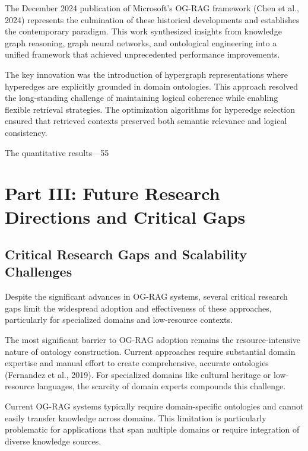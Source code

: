 \documentclass[12pt]{report}
\begin{document}
The December 2024 publication of Microsoft's OG-RAG framework (Chen et al., 2024) represents the culmination of these historical developments and establishes the contemporary paradigm. This work synthesized insights from knowledge graph reasoning, graph neural networks, and ontological engineering into a unified framework that achieved unprecedented performance improvements.

The key innovation was the introduction of hypergraph representations where hyperedges are explicitly grounded in domain ontologies. This approach resolved the long-standing challenge of maintaining logical coherence while enabling flexible retrieval strategies. The optimization algorithms for hyperedge selection ensured that retrieved contexts preserved both semantic relevance and logical consistency.

The quantitative results—55%

\section{Part III: Future Research Directions and Critical Gaps}

\subsection{Critical Research Gaps and Scalability Challenges}

Despite the significant advances in OG-RAG systems, several critical research gaps limit the widespread adoption and effectiveness of these approaches, particularly for specialized domains and low-resource contexts.

The most significant barrier to OG-RAG adoption remains the resource-intensive nature of ontology construction. Current approaches require substantial domain expertise and manual effort to create comprehensive, accurate ontologies (Fernandez et al., 2019). For specialized domains like cultural heritage or low-resource languages, the scarcity of domain experts compounds this challenge.

Current OG-RAG systems typically require domain-specific ontologies and cannot easily transfer knowledge across domains. This limitation is particularly problematic for applications that span multiple domains or require integration of diverse knowledge sources.
\end{document}
